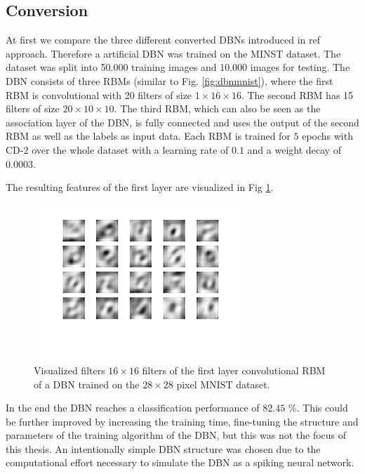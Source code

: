 \subsection{Conversion} \label{c:conversionexp}

At first we compare the three different converted DBNs introduced in ref approach.
Therefore a artificial DBN was trained on the MINST dataset.
The dataset was split into 50.000 training images and 10.000 images for testing.
The DBN consists of three RBMs (similar to Fig. \ref{fig:dbnmnist}), where the first RBM is convolutional with 20 filters of size $1 \times 16 \times 16$. 
The second RBM has 15 filters of size $20 \times 10 \times 10$. 
The third RBM, which can also be seen as the association layer of the DBN, is fully connected and uses the output of the second RBM as well as the labels as input data.  
Each RBM is trained for $5$ epochs with CD-$2$ over the whole dataset with a learning rate of $0.1$ and a weight decay of $0.0003$.

The resulting features of the first layer are visualized in Fig \ref{fig:rbmw}.

\begin{figure}
	\centering
    	\includegraphics[width=0.7\textwidth]{imgs/weights_rbm.png} 
    \caption{Visualized filters $16 \times 16$ filters of the first layer convolutional RBM of a DBN trained on the $28 \times 28$ pixel MNIST dataset.}
	\label{fig:rbmw}
\end{figure}

In the end the DBN reaches a classification performance of $82.45$ \%. 
This could be further improved by increasing the training time, fine-tuning the structure and parameters of the training algorithm of the DBN, but this was not the focus of this thesis.
An intentionally simple DBN structure was chosen due to the computational effort necessary to simulate the DBN as a spiking neural network. 


